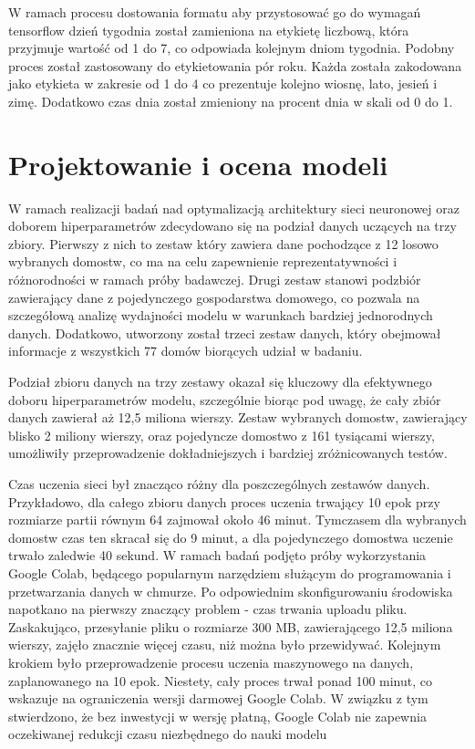 \documentclass[a4paper,twoside,12pt]{book}
\begin{document}
W ramach procesu dostowania formatu aby przystosować go do wymagań tensorflow dzień tygodnia został zamieniona na etykietę liczbową, która przyjmuje wartość od 1 do 7, co odpowiada kolejnym dniom tygodnia. Podobny proces został zastosowany do etykietowania pór roku. Każda została zakodowana jako etykieta w zakresie od 1 do 4 co prezentuje kolejno wiosnę, lato, jesień i zimę. Dodatkowo czas dnia został zmieniony na procent dnia w skali od 0 do 1.
\section{Projektowanie i ocena modeli}
W ramach realizacji badań nad optymalizacją architektury sieci neuronowej oraz doborem hiperparametrów zdecydowano się na podział danych uczących na trzy zbiory. Pierwszy z nich to zestaw który zawiera dane pochodzące z 12 losowo wybranych domostw, co ma na celu zapewnienie reprezentatywności i różnorodności w ramach próby badawczej. Drugi zestaw stanowi podzbiór zawierający dane z pojedynczego gospodarstwa domowego, co pozwala na szczegółową analizę wydajności modelu w warunkach bardziej jednorodnych danych. Dodatkowo, utworzony został trzeci zestaw danych, który obejmował informacje z wszystkich 77 domów biorących udział w badaniu.


Podział zbioru danych na trzy zestawy okazał się kluczowy dla efektywnego doboru hiperparametrów modelu, szczególnie biorąc pod uwagę, że cały zbiór danych zawierał aż 12,5 miliona wierszy. Zestaw wybranych domostw, zawierający blisko 2 miliony wierszy, oraz pojedyncze domostwo z 161 tysiącami wierszy, umożliwiły przeprowadzenie dokładniejszych i bardziej zróżnicowanych testów.

Czas uczenia sieci był znacząco różny dla poszczególnych zestawów danych. Przykładowo, dla całego zbioru danych proces uczenia trwający 10 epok przy rozmiarze partii równym 64 zajmował około 46 minut. Tymczasem dla wybranych domostw czas ten skracał się do 9 minut, a dla pojedynczego domostwa uczenie trwało zaledwie 40 sekund. W ramach badań podjęto próby wykorzystania Google Colab, będącego popularnym narzędziem służącym do programowania i przetwarzania danych w chmurze. Po odpowiednim skonfigurowaniu środowiska napotkano na pierwszy znaczący problem - czas trwania uploadu pliku. Zaskakująco, przesyłanie pliku o rozmiarze 300 MB, zawierającego 12,5 miliona wierszy, zajęło znacznie więcej czasu, niż można było przewidywać. Kolejnym krokiem było przeprowadzenie procesu uczenia maszynowego na danych, zaplanowanego na 10 epok. Niestety, cały proces trwał ponad 100 minut, co wskazuje na ograniczenia wersji darmowej Google Colab. W związku z tym stwierdzono, że bez inwestycji w wersję płatną, Google Colab nie zapewnia oczekiwanej redukcji czasu niezbędnego do nauki modelu\\
\end{document}
